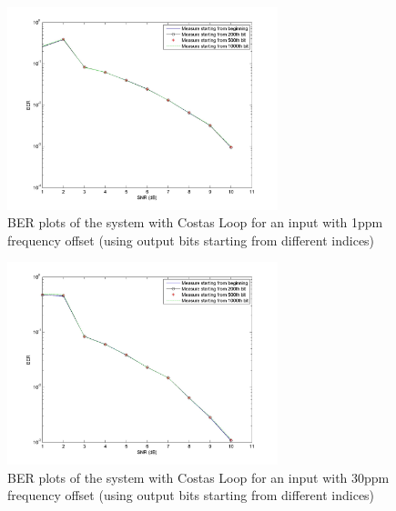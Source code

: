 \documentclass[]{article}
\begin{document}
\begin{figure}[H]
\centering
\hspace*{-2cm}\includegraphics[width=0.7\textwidth]{qpBERfo_costas1.jpg}
\caption{BER plots of the system with Costas Loop for an input with 1ppm frequency offset (using output bits starting from different indices)}
\end{figure}

\begin{figure}[H]
\centering
\hspace*{-2cm}\includegraphics[width=0.7\textwidth]{qpBERfo_costas2.jpg}
\caption{BER plots of the system with Costas Loop for an input with 30ppm frequency offset (using output bits starting from different indices)}
\end{figure}
\end{document}
